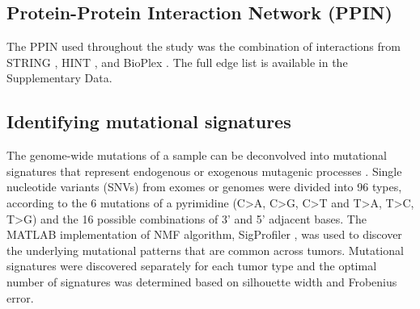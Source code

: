 \documentclass[english, 10pt, letterpaper]{article}
\begin{document}
\subsection*{Protein-Protein Interaction Network (PPIN)}

The PPIN used throughout the study was the combination of interactions from STRING \cite{VonMering2005, Szklarczyk2019}, HINT \cite{Das2012}, and BioPlex \cite{Huttlin2015}.
The full edge list is available in the Supplementary Data.


\subsection*{Identifying mutational signatures}

The genome-wide mutations of a sample can be deconvolved into mutational signatures that represent endogenous or exogenous mutagenic processes \cite{Alexandrov2013}. 
Single nucleotide variants (SNVs) from exomes or genomes were divided into 96 types, according to the 6 mutations of a pyrimidine (C>A, C>G, C>T and T>A, T>C, T>G) and the 16 possible combinations of 3’ and 5’ adjacent bases.
The MATLAB \cite{MATLAB:2010} implementation of NMF algorithm, SigProfiler \cite{Alexandrov2013}, was used to discover the underlying mutational patterns that are common across tumors. 
Mutational signatures were discovered separately for each tumor type and the optimal number of signatures was determined based on silhouette width and Frobenius error. 
\end{document}
